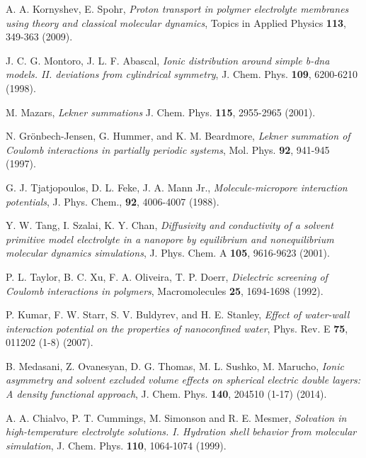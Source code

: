 \documentclass[3p,english,preprint]{elsarticle}
\begin{document}
\begin{thebibliography}{00}
 A. A. Kornyshev, E.  Spohr,
{\it Proton transport in polymer electrolyte membranes using theory and classical molecular dynamics},
 Topics in Applied Physics {\bf 113}, 349-363  (2009).





 J. C. G. Montoro, J. L. F. Abascal,
{\it Ionic distribution around simple b-dna models. II. deviations from cylindrical symmetry}, 
  J. Chem. Phys. {\bf 109},  6200-6210 (1998).



M.  Mazars,
{\it  Lekner summations}
J. Chem. Phys. {\bf 115}, 2955-2965 (2001).


 
N. Gr{\"o}nbech-Jensen, G. Hummer, and K. M. Beardmore, 
{\it  Lekner summation of Coulomb interactions in partially periodic systems},
 Mol. Phys. {\bf 92}, 941-945 (1997). 




G.  J. Tjatjopoulos, D.  L. Feke, J. A.  Mann Jr.,
{\it  Molecule-micropore interaction potentials}, 
J. Phys. Chem., {\bf 92},  4006-4007 (1988).



Y. W. Tang, I. Szalai, K. Y. Chan,
{\it Diffusivity and conductivity of a solvent primitive model electrolyte
 in a nanopore by equilibrium and nonequilibrium molecular dynamics
 simulations}, 
J. Phys. Chem. A  {\bf 105}, 9616-9623  (2001).

P. L. Taylor, B. C. Xu, F. A. Oliveira, T. P. Doerr, 
{\it Dielectric screening of Coulomb interactions in polymers},
Macromolecules {\bf  25}, 1694-1698  (1992).





P.  Kumar, F.  W. Starr, S. V. Buldyrev, and H. E. Stanley, 
{\it Effect of water-wall interaction potential on the properties of nanoconfined water}, 
Phys. Rev. E {\bf 75},  011202 (1-8) (2007).

B. Medasani, Z. Ovanesyan, D. G. Thomas, M. L. Sushko,  M. Marucho,
{\it Ionic asymmetry and solvent excluded volume effects on spherical electric double layers:
 A density functional approach}, 
J. Chem. Phys. {\bf 140}, 204510 (1-17) (2014).

A. A. Chialvo,  P. T. Cummings,  M. Simonson and R. E. Mesmer,
{\it Solvation in high-temperature electrolyte solutions. I. Hydration shell behavior 
from molecular simulation},
J. Chem. Phys. {\bf 110},  1064-1074 (1999).



\end{thebibliography}
\end{document}
